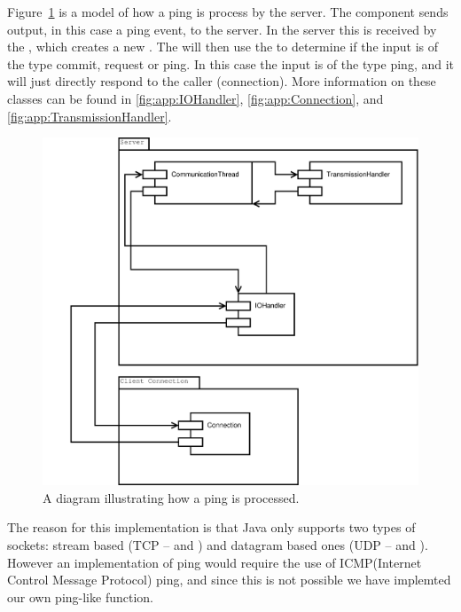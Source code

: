 Figure~\ref{fig:IOPing} is a model of how a ping is process by the server. The  component sends output, in this case a ping event, to the server. In the server this is received by the , which creates a new \newline {}.
The  will then use the \newline {} to determine if the input is of the type commit, request or ping.
In this case the input is of the type ping, and it will just directly respond to the caller (connection). 
More information on these classes can be found in \autoref{fig:app:IOHandler}, \autoref{fig:app:Connection}, and \autoref{fig:app:TransmissionHandler}.
\begin{figure}[htbp]
	\centering
          \includegraphics[scale=0.30]{images/ping}%
	\caption{A diagram illustrating how a ping is processed.} 
	\label{fig:IOPing}
\end{figure}

The reason for this implementation is that Java only supports two types of sockets: stream based (TCP --  and ) and datagram based ones (UDP --  \newline and )\cite{ICMP}\cite{javaNET}.
However an implementation of ping would require the use of ICMP(Internet Control Message Protocol) ping, and since this is not possible we have implemted our own ping-like function.


